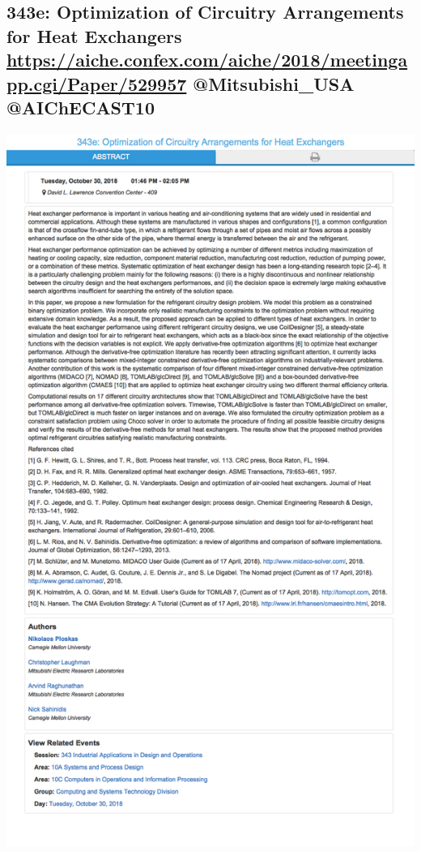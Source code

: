 \documentclass[11pt]{article}
\begin{document}
\subsection{343e: Optimization of Circuitry Arrangements for Heat Exchangers \url{https://aiche.confex.com/aiche/2018/meetingapp.cgi/Paper/529957} @Mitsubishi\_USA @AIChECAST10}
\label{sec:org90eaaf4}
\begin{center}
\includegraphics[width=.9\linewidth]{./529957.png}
\end{center}
\end{document}
